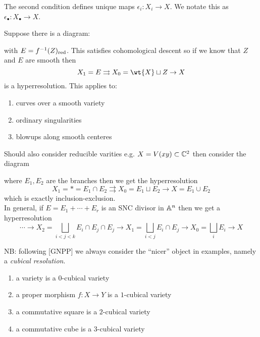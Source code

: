 \documentclass[12pt]{article}
\begin{document}
\begin{rmk}
The second condition defines unique maps $\epsilon_i : X_i \to X$. We notate this as $\epsilon_\bullet : X_\bullet \to X$.
\end{rmk}

\begin{exercise}
Suppose there is a diagram:
\begin{center}
\end{center}
with $E = f^{-1}(Z)_{\mathrm{red}}$. This satisfies cohomological descent so if we know that $Z$ and $E$ are smooth then
\[ X_1 = E \rightrightarrows X_0 = \wt{X} \sqcup Z \to X \]
is a hyperresolution. This applies to:
\begin{enumerate}
\item curves over a smooth variety 
\item ordinary singularities
\item blowups along smooth centeres
\end{enumerate}
Should also consider reducible varities e.g. $X = V(xy) \subset \mathbb{C}^2$ then consider the diagram
\begin{center}
\end{center}
where $E_1, E_2$ are the branches then we get the hyperresolution
\[ X_1 = * = E_1 \cap E_2 \rightrightarrows X_0 = E_1 \sqcup E_2 \to X = E_1 \cup E_2 \]
which is exactly inclusion-exclusion.
\bigskip\\
In general, if $E = E_1 + \cdots + E_r$ is an SNC divisor in $\mathbb{A}^n$ then we get a hyperresolution
\[ \cdots \to X_2 = \bigsqcup_{i < j < k} E_i \cap E_j \cap E_j \to X_1 = \bigsqcup_{i < j} E_i \cap E_j \to X_0 = \bigsqcup_i E_i \to X \]
\end{exercise}

NB: following [GNPP] we always consider the ``nicer'' object in examples, namely a \textit{cubical resolution}.  

\begin{example}
\begin{enumerate}
\item a variety is a $0$-cubical variety
\item a proper morphism $f : X \to Y$ is a $1$-cubical variety
\item a commutative square is a $2$-cubical variety
\item a commutative cube is a $3$-cubical variety
\end{enumerate}
\end{example}
\end{document}

